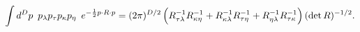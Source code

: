 \begin{equation}
    \int d^Dp\,\,\,
        p_{\lambda}p_{\tau}p_{\kappa}p_{\eta}\,\,\,
        e^{-\frac{1}{2}p\cdot R\cdot p}
    =
    (2\pi)^{D/2}
    \left(
        R^{-1}_{{\tau}{\lambda}}
            R^{-1}_{{\kappa}{\eta}}
        +R^{-1}_{{\kappa}{\lambda}}
            R^{-1}_{{\tau}{\eta}}
        +R^{-1}_{{\eta}{\lambda}}
            R^{-1}_{{\tau}{\kappa}}
    \right)
        (\det R)^{-1/2}.
\nonumber\\ \label{dpp4}
\end{equation}

